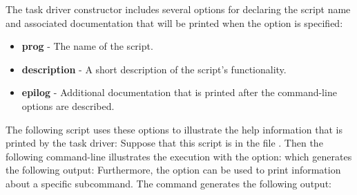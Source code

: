 The task driver constructor includes several options for declaring the script name and associated
documentation that will be printed when the  option is specified:
\begin{itemize}

\item {\bf prog} - The name of the script.

\item {\bf description} - A short description of the script's functionality.

\item {\bf epilog} - Additional documentation that is printed after the command-line options are described.
\end{itemize}
The following script uses these options to illustrate the help information that is printed by the task
driver:
Suppose that this script is in the file .  Then the following command-line illustrates the
execution with the  option:
which generates the following output:
Furthermore, the  option can be used to print information about a specific subcommand.  The 
command
generates the following output:

